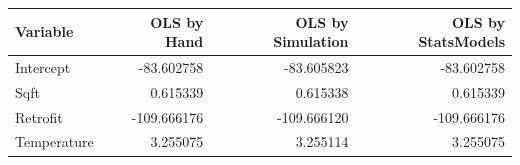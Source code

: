 \begin{tabular}{lrrr}
\toprule
Variable & OLS by Hand & OLS by Simulation & OLS by StatsModels \\
\midrule
Intercept & -83.602758 & -83.605823 & -83.602758 \\
Sqft & 0.615339 & 0.615338 & 0.615339 \\
Retrofit & -109.666176 & -109.666120 & -109.666176 \\
Temperature & 3.255075 & 3.255114 & 3.255075 \\
\bottomrule
\end{tabular}
